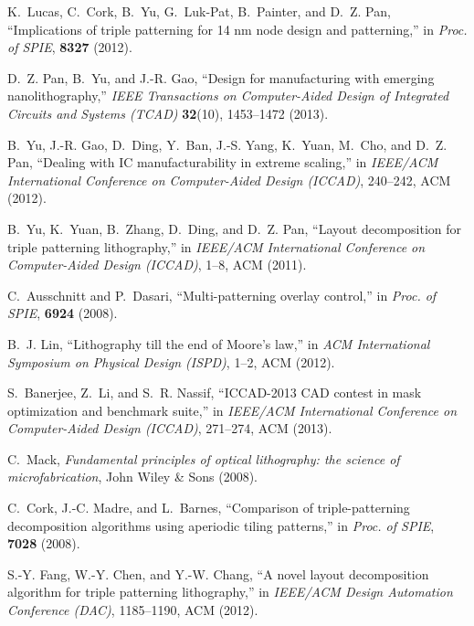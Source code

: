 \documentclass[12pt]{spieman}
\theoremstyle{plain}
\begin{document}
\begin{spacing}{1}

\begin{thebibliography}{10}
K.~Lucas, C.~Cork, B.~Yu, G.~Luk-Pat, B.~Painter, and D.~Z. Pan, ``Implications
  of triple patterning for 14 nm node design and patterning,'' in {\em Proc. of
  SPIE},   {\bf 8327}  (2012).

D.~Z. Pan, B.~Yu, and J.-R. Gao, ``Design for manufacturing with emerging
  nanolithography,'' {\em IEEE Transactions on Computer-Aided Design of
  Integrated Circuits and Systems (TCAD)} {\bf 32}(10), 1453--1472  (2013).

B.~Yu, J.-R. Gao, D.~Ding, Y.~Ban, J.-S. Yang, K.~Yuan, M.~Cho, and D.~Z. Pan,
  ``Dealing with {IC} manufacturability in extreme scaling,'' in {\em IEEE/ACM
  International Conference on Computer-Aided Design (ICCAD)},  240--242, ACM
  (2012).

B.~Yu, K.~Yuan, B.~Zhang, D.~Ding, and D.~Z. Pan, ``Layout decomposition for
  triple patterning lithography,'' in {\em IEEE/ACM International Conference on
  Computer-Aided Design (ICCAD)},  1--8, ACM  (2011).

C.~Ausschnitt and P.~Dasari, ``Multi-patterning overlay control,'' in {\em
  Proc. of SPIE},   {\bf 6924}  (2008).

B.~J. Lin, ``Lithography till the end of {Moore}'s law,'' in {\em ACM
  International Symposium on Physical Design (ISPD)},  1--2, ACM  (2012).

S.~Banerjee, Z.~Li, and S.~R. Nassif, ``{ICCAD-2013 CAD} contest in mask
  optimization and benchmark suite,'' in {\em IEEE/ACM International Conference
  on Computer-Aided Design (ICCAD)},  271--274, ACM  (2013).

C.~Mack, {\em Fundamental principles of optical lithography: the science of
  microfabrication}, John Wiley \& Sons  (2008).

C.~Cork, J.-C. Madre, and L.~Barnes, ``Comparison of triple-patterning
  decomposition algorithms using aperiodic tiling patterns,'' in {\em Proc. of
  SPIE},   {\bf 7028}  (2008).

S.-Y. Fang, W.-Y. Chen, and Y.-W. Chang, ``A novel layout decomposition
  algorithm for triple patterning lithography,'' in {\em IEEE/ACM Design
  Automation Conference (DAC)},  1185--1190, ACM  (2012).


\end{thebibliography}
\end{spacing}
\end{document}
